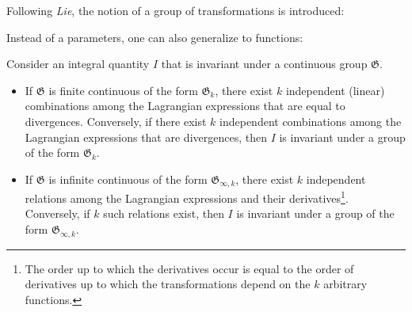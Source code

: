     Following \textit{Lie}, the notion of a group of transformations is introduced:

    Instead of a parameters, one can also generalize to functions:

    \begin{theorem}[Noether]\label{var:noether}
        Consider an integral quantity $I$ that is invariant under a continuous group $\mathfrak{G}$.
        \begin{itemize}
            \item If $\mathfrak{G}$ is finite continuous of the form $\mathfrak{G}_k$, there exist $k$ independent (linear) combinations among the Lagrangian expressions that are equal to divergences. Conversely, if there exist $k$ independent combinations among the Lagrangian expressions that are divergences, then $I$ is invariant under a group of the form $\mathfrak{G}_k$.
            \item If $\mathfrak{G}$ is infinite continuous of the form $\mathfrak{G}_{\infty,k}$, there exist $k$ independent relations among the Lagrangian expressions and their derivatives\footnote{The order up to which the derivatives occur is equal to the order of derivatives up to which the transformations depend on the $k$ arbitrary functions.}. Conversely, if $k$ such relations exist, then $I$ is invariant under a group of the form $\mathfrak{G}_{\infty,k}$.
        \end{itemize}
    \end{theorem}

